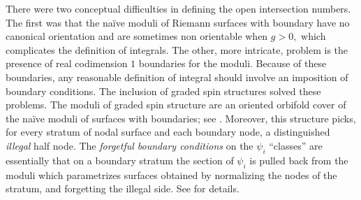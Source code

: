 \documentclass[11pt]{amsart}
\theoremstyle{definition}
\theoremstyle{remark}
\newcommand{\<}{\left<}
\renewcommand{\>}{\right>}
\numberwithin{equation}{section}
\begin{document}
There were two conceptual difficulties in defining the open intersection numbers. The first was that the na\"ive moduli of Riemann surfaces with %
boundary have no %
canonical orientation and are sometimes %
non orientable when %
$g>0,$ which complicates %
the definition of integrals. The other, more intricate, problem is the presence of real codimension $1$ boundaries for the moduli. Because of %
these boundaries, any %
reasonable definition of integral should involve an imposition of boundary conditions. The inclusion of graded spin structures solved these problems. The moduli of graded spin %
structure are an %
oriented orbifold cover of the na\"ive moduli of surfaces %
with boundaries; see %
\cite[\S 5]{Tes15}. Moreover, this structure picks, for every stratum of %
nodal surface and %
each boundary node, a distinguished \emph{illegal} half node. The \emph{forgetful boundary conditions} on the $\psi_i$ ``classes'' are essentially that on a boundary stratum the section of $\psi_i$ is pulled back from the moduli which parametrizes surfaces obtained by normalizing the nodes of the stratum, and forgetting the illegal side. See \cite[\S 2]{Tes15} for details. 
\end{document}
